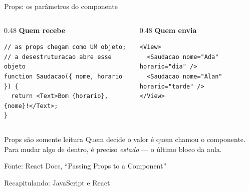 \documentclass[aspectratio=169]{beamer}
\newcommand{\fonte}[1]{\vfill\hfill{\scriptsize\textcolor{UFSGray}{Fonte: #1}}}
\begin{document}
\begin{frame}[fragile]{Props: os parâmetros do componente}
  \begin{columns}[T]
    \begin{column}{0.48\textwidth}
      \textbf{Quem recebe}
\begin{lstlisting}[style=jsx]
// as props chegam como UM objeto;
// a desestruturacao abre esse objeto
function Saudacao({ nome, horario }) {
  return <Text>Bom {horario}, {nome}!</Text>;
}
\end{lstlisting}
    \end{column}
    \begin{column}{0.48\textwidth}
      \textbf{Quem envia}
\begin{lstlisting}[style=jsx]
<View>
  <Saudacao nome="Ada" horario="dia" />
  <Saudacao nome="Alan" horario="tarde" />
</View>
\end{lstlisting}
    \end{column}
  \end{columns}
  \begin{alertblock}{Props são somente leitura}
    Quem decide o valor é quem chamou o componente. Para mudar algo de
    dentro, é preciso \emph{estado} --- o último bloco da aula.
  \end{alertblock}
  \fonte{React Docs, ``Passing Props to a Component''~\cite{react2025docs}}
\end{frame}

\begin{frame}{Recapitulando: JavaScript e React}
  \begin{center}
  \end{center}
\end{frame}
\end{document}
